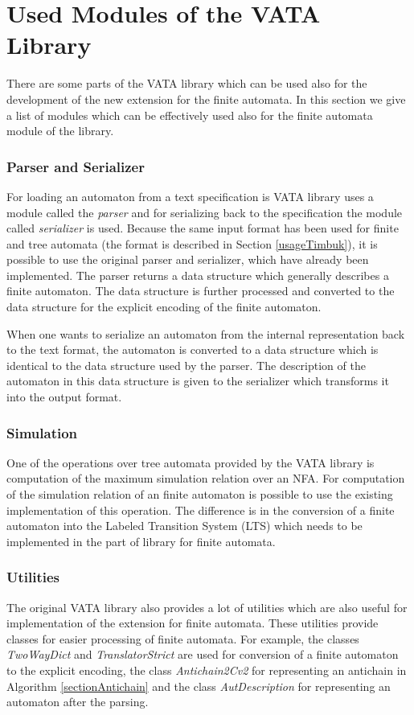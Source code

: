 \section{Used Modules of the VATA Library}
There are some parts of the VATA library which can be used also for the development of the new extension for the finite automata. 
In this section we give a list of modules which can be effectively used also for the finite automata module of the library.

\subsubsection{Parser and Serializer}
For loading an automaton from a text specification is VATA library uses a module called the \emph{parser} and for serializing back to the specification the 
module called \emph{serializer} is used. 
Because the same input format has been used for finite and tree automata (the format is described in Section \ref{usageTimbuk}),
it is possible to use the original parser and serializer, which have already been implemented. 
The parser returns a data structure which generally describes a finite automaton. The data structure is further processed and converted 
to the data structure for the explicit encoding of the finite automaton. 

When one wants to serialize an automaton from the internal representation back to the text format, 
the automaton is converted to a data structure which is identical to the data structure used by the parser. The description of the automaton in this
data structure is given to the serializer which transforms it into the output format.

\subsubsection{Simulation}
One of the operations over tree automata provided by the VATA library is computation of the maximum simulation relation over an NFA. 
For computation of the simulation relation of an finite automaton is possible to use the existing implementation of this operation. 
The difference is in the conversion of a finite automaton into the Labeled Transition System (LTS) which
needs to be implemented in the part of library for finite automata.

\subsubsection{Utilities}
The original VATA library also provides a lot of utilities which are also useful for implementation of the extension for finite automata. These utilities
provide classes for easier processing of finite automata. For example, the classes \emph{TwoWayDict} and \emph{TranslatorStrict} are used for conversion
of a finite automaton to the explicit encoding, the class \emph{Antichain2Cv2} for representing an antichain in Algorithm \ref{sectionAntichain} 
and the class \emph{AutDescription} for representing an automaton after the parsing.

